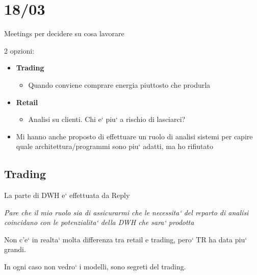\section{18/03}
    Meetings per decidere su cosa lavorare
    
    2 opzioni:
    \begin{itemize}
        \item \textbf{Trading}
        \begin{itemize}
            \item Quando conviene comprare energia piuttosto che produrla
        \end{itemize}
        
        \item \textbf{Retail}
        \begin{itemize}
            \item Analisi su clienti. Chi e` piu` a rischio di lasciarci?
        \end{itemize}
        
        \item Mi hanno anche proposto di effettuare un ruolo di analisi sistemi per capire quale architettura/programmi sono piu` adatti, ma ho rifiutato
    \end{itemize}
    
    \subsection{Trading}
        La parte di DWH e` effettuata da Reply
        
        \textit{Pare che il mio ruolo sia di assicurarmi che le necessita` del reparto di analisi coincidano con le potenzialita` della DWH che sara` prodotta}
        
        Non c'e` in realta` molta differenza tra retail e trading, pero` TR ha data piu` grandi.
        
        In ogni caso non vedro` i modelli, sono segreti del trading.